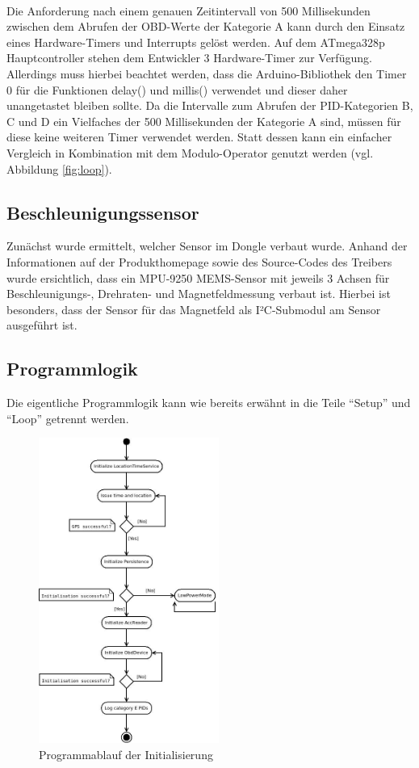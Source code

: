 \paragraph{}
Die Anforderung nach einem genauen Zeitintervall von 500 Millisekunden zwischen dem Abrufen der OBD-Werte der Kategorie A kann durch den Einsatz eines Hardware-Timers und Interrupts gelöst werden.
Auf dem ATmega328p Hauptcontroller stehen dem Entwickler 3 Hardware-Timer zur Verfügung. Allerdings muss hierbei beachtet werden, dass die Arduino-Bibliothek den Timer 0 für die Funktionen delay() und millis() verwendet und dieser daher unangetastet bleiben sollte.\cite{arduinoTimer}
Da die Intervalle zum Abrufen der PID-Kategorien B, C und D ein Vielfaches der 500 Millisekunden der Kategorie A sind, müssen für diese keine weiteren Timer verwendet werden. Statt dessen kann ein einfacher Vergleich in Kombination mit dem Modulo-Operator genutzt werden (vgl. Abbildung \ref{fig:loop}).
\subsection{Beschleunigungssensor}
Zunächst wurde ermittelt, welcher Sensor im Dongle verbaut wurde. Anhand der Informationen auf der Produkthomepage sowie des Source-Codes des Treibers wurde ersichtlich, dass ein MPU-9250 \ac{MEMS}-Sensor mit jeweils 3 Achsen für Beschleunigungs-, Drehraten- und Magnetfeldmessung verbaut ist. Hierbei ist besonders, dass der Sensor für das Magnetfeld als I²C-Submodul am Sensor ausgeführt ist.
\subsection{Programmlogik}
\label{subsec:ProgLogik}
Die eigentliche Programmlogik kann wie bereits erwähnt in die Teile \enquote{Setup} und \enquote{Loop} getrennt werden.
\begin{figure}
  \begin{center}
    \includegraphics[width=\textwidth,height=10cm,keepaspectratio]{./img/Startup}
    \caption{Programmablauf der Initialisierung}
    \label{fig:setup}
  \end{center}
\end{figure}
